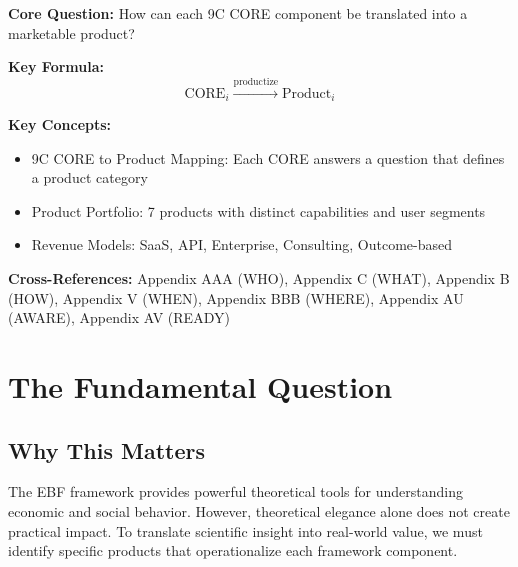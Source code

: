 
\begin{tcolorbox}[colback=blue!5!white, colframe=blue!75!black,
    title=Quick Reference: Product Options Matrix]

\textbf{Core Question:} How can each 9C CORE component be translated into a marketable product?

\textbf{Key Formula:}
\begin{equation}
\text{CORE}_i \xrightarrow{\text{productize}} \text{Product}_i
\end{equation}

\textbf{Key Concepts:}
\begin{itemize}[nosep]
\item 9C CORE to Product Mapping: Each CORE answers a question that defines a product category
\item Product Portfolio: 7 products with distinct capabilities and user segments
\item Revenue Models: SaaS, API, Enterprise, Consulting, Outcome-based
\end{itemize}

\textbf{Cross-References:} Appendix AAA (WHO), Appendix C (WHAT), Appendix B (HOW), Appendix V (WHEN), Appendix BBB (WHERE), Appendix AU (AWARE), Appendix AV (READY)
\end{tcolorbox}



\section{The Fundamental Question}
\label{sec:vvv3-fundamental}

\subsection{Why This Matters}

The EBF framework provides powerful theoretical tools for understanding economic and social behavior. However, theoretical elegance alone does not create practical impact. To translate scientific insight into real-world value, we must identify specific products that operationalize each framework component.

